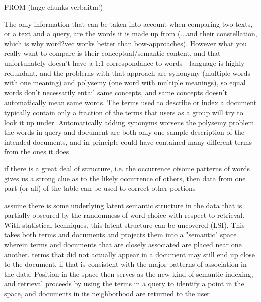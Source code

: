 


FROM \cite{deerwester} (huge chunks verbaitm!)

The only information that can be taken into account when comparing two texts, or a text and a query, are the words it is made up from (...and their constellation, which is why word2vec works better than \gls{bow}-approaches). 
However what you really want to compare is their conceptual/semantic content, and that unfortunately doesn't have a 1:1 correspondance to words - language is highly redundant, and the problems with that approach are synonymy (multiple words with one meaning) and polysemy (one word with multiple meanings), so equal words don't necessarily entail same concepts, and same concepts doesn't automatically mean same words. The terms used to describe or index a document typically contain only a fraction of the terms that users as a group will try to look it up under. Automatically adding synonyms worsens the polysemy problem. the words in query and document are both only one sample description of the intended documents, and in principle could have contained many different terms from the ones it does

if there is a great deal of structure, i.e. the occurrence ofsome patterns of words gives us a strong clue as to the likely occurrence of others, then data from one part (or all) of the table can be used to correct other portions

assume there is some underlying latent semantic structure in the data that is partially obscured by the randomness of word choice with respect to retrieval. With statistical techniques, this latent structure can be uncovered (LSI). This takes both terms and documents and projects them into a "semantic" space wherein terms and documents that are closely associated are placed near one another. terms that did not actually appear in a document may still end up close to the document, if that is consistent with the major patterns of association in the data. Position in the space then serves as the new kind of semantic indexing, and retrieval proceeds by using the terms in a query to identify a point in the space, and documents in its neighborhood are returned to the user

